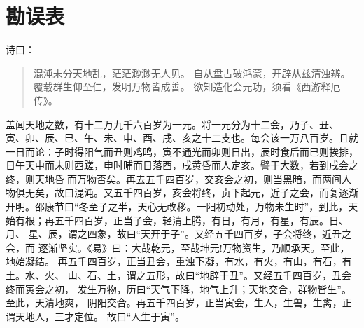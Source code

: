 \documentclass[]{style/zjuthesis}
\begin{document}



\makeenglishtitle



\makeOSandCPRTpage


\ZJUfrontmatter



\chapter{勘误表}

诗曰：

\begin{quote}
混沌未分天地乱，茫茫渺渺无人见。 自从盘古破鸿蒙，开辟从兹清浊辨。
覆载群生仰至仁，发明万物皆成善。 欲知造化会元功，须看《西游释厄传》。
\end{quote}

盖闻天地之数，有十二万九千六百岁为一元。将一元分为十二会，乃子、丑、
寅、卯、辰、巳、午、未、申、酉、戌、亥之十二支也。每会该一万八百岁。且就
一日而论：子时得阳气而丑则鸡鸣，寅不通光而卯则日出，辰时食后而巳则挨排，
日午天中而未则西蹉，申时晡而日落酉，戌黄昏而人定亥。譬于大数，若到戌会之
终，则天地昏而万物否矣。再去五千四百岁，交亥会之初，则当黑暗，而两间人
物俱无矣，故曰混沌。又五千四百岁，亥会将终，贞下起元，近子之会，而复逐渐
开明。邵康节曰``冬至子之半，天心无改移。一阳初动处，万物未生时''，到此，天
始有根；再五千四百岁，正当子会，轻清上腾，有日，有月，有星，有辰。日、月、
星、辰，谓之四象，故曰``天开于子''。又经五千四百岁，子会将终，近丑之会，而
逐渐坚实。《易》曰：大哉乾元，至哉坤元!万物资生，乃顺承天。至此，地始凝结。
再五千四百岁，正当丑会，重浊下凝，有水，有火，有山，有石，有土。水、火、
山、石、土，谓之五形，故曰``地辟于丑''。又经五千四百岁，丑会终而寅会之初，
发生万物，历曰``天气下降，地气上升；天地交合，群物皆生''。至此，天清地爽，
阴阳交合。再五千四百岁，正当寅会，生人，生兽，生禽，正谓天地人，三才定位。
故曰``人生于寅''。
\end{document}
